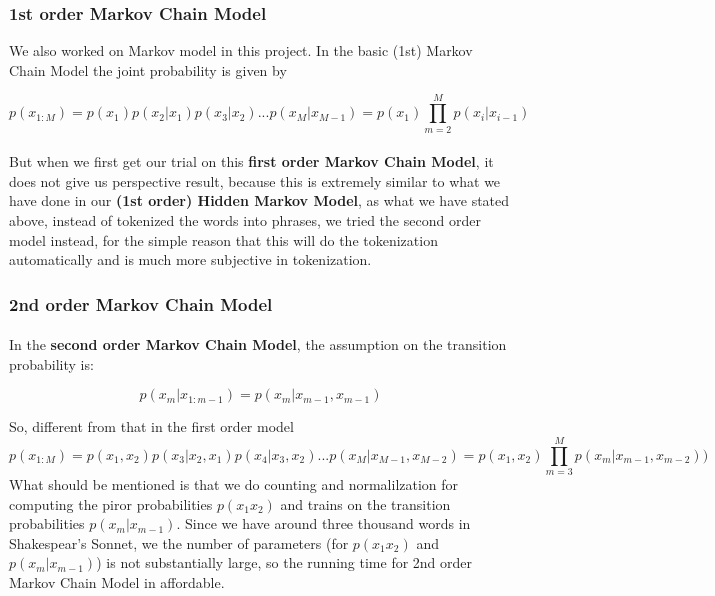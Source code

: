 %
\subsubsection{1st order Markov Chain Model}
We also worked on Markov model in this project. In the basic (1st) Markov Chain Model the joint probability is given by

\begin{equation}
  p(x_{1:M}) = p(x_1)p(x_2|x_1)p(x_3|x_2) ...  p(x_M|x_{M-1}) = p(x_1) \prod\limits_{m=2}^M p(x_i|x_{i-1})
\end{equation}
\paragraph{}
But when we first get our trial on this \textbf{first order Markov Chain Model}, it does not give us perspective result, because this is extremely similar to what we have done in our \textbf{(1st order) Hidden Markov Model}, as what we have stated above, instead of tokenized the words into phrases, we tried the second order model instead, for the simple reason that this will do the tokenization automatically and is much more subjective in tokenization.

\subsubsection{2nd order Markov Chain Model}
\paragraph{}
In the \textbf{second order Markov Chain Model}, the assumption on the transition probability is:

\begin{equation}
  p(x_m|x_{1:m-1}) = p(x_m|x_{m-1}, x_{m-1})
\end{equation}

So, different from that in the first order model
\begin{equation}
  p(x_{1:M}) =p(x_1, x_2)p(x_3|x_2, x_1)p(x_4|x_3, x_2) ...  p(x_M|x_{M-1}, x_{M-2}) = p(x_1, x_2) \prod\limits_{m=3}^M p(x_m|x_{m-1}, x_{m-2}))
\end{equation} 
What should be mentioned is that we do counting and normalilzation for computing the piror probabilities $p(x_1 x_2)$ and trains on the transition probabilities $p(x_m|x_{m-1})$. Since we have around three thousand words in Shakespear's Sonnet, we the number of parameters (for $p(x_1 x_2)$ and $p(x_m|x_{m-1})$) is not substantially large, so the running time for 2nd order Markov Chain Model in affordable.
